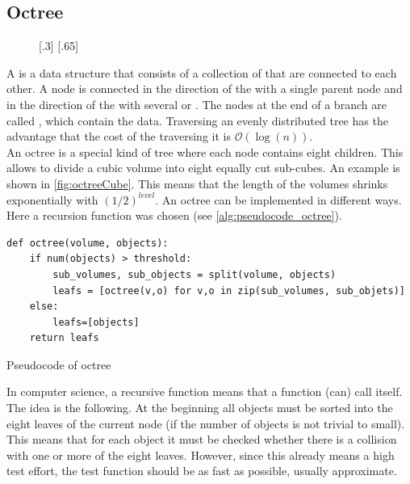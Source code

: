 \subsection{Octree}
% 
\begin{figure}[!t]
    \centering
    [.3\textwidth]{
    \def\tikzheight{0.6\textwidth}
    }
    [.65\textwidth]{
    \def\tikzheight{0.6\textwidth}
    }
	\caption{}
	\label{fig:octree}
\end{figure}
% 
A  is a data structure that consists of a collection of  that are connected to each other.
A node is connected in the direction of the  with a single parent node and in the direction of the  with several  or .
The nodes at the end of a branch are called , which contain the data.
Traversing an evenly distributed tree has the advantage that the cost of the traversing it is $\mathcal{O}(\log(n))$.
\\
% 
An octree is a special kind of tree where each node contains eight children.
This allows to divide a cubic volume into eight equally cut sub-cubes.
An example is shown in \cref{fig:octreeCube}.
This means that the length of the volumes shrinks exponentially with $(1/2)^\mathit{level}$.
An octree can be implemented in different ways.
Here a recursion function was chosen (see \cref{alg:pseudocode_octree}).
% 
\begin{lstfloat}[!tb]
\lstset{style=python}
\begin{lstlisting}[]
def octree(volume, objects):
    if num(objects) > threshold:
        sub_volumes, sub_objects = split(volume, objects)
        leafs = [octree(v,o) for v,o in zip(sub_volumes, sub_objets)]
    else:
        leafs=[objects]
    return leafs
\end{lstlisting}
\caption{Pseudocode of octree}
\label{alg:pseudocode_octree}
\end{lstfloat}
% 
In computer science, a recursive function means that a function (can) call itself.
The idea is the following.
At the beginning all objects must be sorted into the eight leaves of the current node (if the number of objects is not trivial to small).
This means that for each object it must be checked whether there is a collision with one or more of the eight leaves.
However, since this already means a high test effort, the test function should be as fast as possible, usually approximate.
